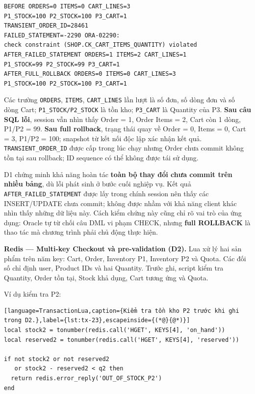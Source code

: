 \begingroup
{}\label{result:tx-17}
\nopagebreak[4]
\begin{Verbatim}
BEFORE ORDERS=0 ITEMS=0 CART_LINES=3
P1_STOCK=100 P2_STOCK=100 P3_CART=1
TRANSIENT_ORDER_ID=28461
FAILED_STATEMENT=-2290 ORA-02290:
check constraint (SHOP.CK_CART_ITEMS_QUANTITY) violated
AFTER_FAILED_STATEMENT ORDERS=1 ITEMS=2 CART_LINES=1
P1_STOCK=99 P2_STOCK=99 P3_CART=1
AFTER_FULL_ROLLBACK ORDERS=0 ITEMS=0 CART_LINES=3
P1_STOCK=100 P2_STOCK=100 P3_CART=1
\end{Verbatim}
\endgroup\par\smallskip
Các trường \texttt{ORDERS}, \texttt{ITEMS}, \texttt{CART\_\allowbreak{}LINES} lần lượt là số đơn, số dòng đơn và số dòng Cart; \texttt{P1\_\allowbreak{}STOCK/\allowbreak{}P2\_\allowbreak{}STOCK} là tồn kho; \texttt{P3\_\allowbreak{}CART} là Quantity của P3. \textbf{Sau câu SQL lỗi}, session vẫn nhìn thấy Order = 1, Order Items = 2, Cart còn 1 dòng, P1/P2 = 99. \textbf{Sau full rollback}, trạng thái quay về Order = 0, Items = 0, Cart = 3, P1/P2 = 100; snapshot từ kết nối độc lập xác nhận kết quả. \texttt{TRANSIENT\_\allowbreak{}ORDER\_\allowbreak{}ID} được cấp trong lúc chạy nhưng Order chưa commit không tồn tại sau rollback; ID sequence có thể không được tái sử dụng.

D1 chứng minh khả năng hoàn tác \textbf{toàn bộ thay đổi chưa commit trên nhiều bảng}, dù lỗi phát sinh ở bước cuối nghiệp vụ. Kết quả \texttt{AFTER\_\allowbreak{}FAILED\_\allowbreak{}STATEMENT} được lấy trong chính session nên thấy các INSERT/UPDATE chưa commit; không được nhầm với khả năng client khác nhìn thấy những dữ liệu này. Cách kiểm chứng này cũng chỉ rõ vai trò của ứng dụng: Oracle tự từ chối câu DML vi phạm CHECK, nhưng \textbf{full ROLLBACK} là thao tác mà chương trình phải chủ động thực hiện.

\textbf{Redis — Multi-key Checkout và pre-validation (D2).} Lua xử lý hai sản phẩm trên năm key: Cart, Order, Inventory P1, Inventory P2 và Quota. Các đối số chỉ định user, Product IDs và hai Quantity. Trước ghi, script kiểm tra Quantity, Order tồn tại, Stock khả dụng, Cart tương ứng và Quota.

Ví dụ kiểm tra P2:

\begin{lstlisting}[language=TransactionLua,caption={Kiểm tra tồn kho P2 trước khi ghi trong D2.},label={lst:tx-23},escapeinside={(*@}{@*)}]
local stock2 = tonumber(redis.call('HGET', KEYS[4], 'on_hand'))
local reserved2 = tonumber(redis.call('HGET', KEYS[4], 'reserved'))

if not stock2 or not reserved2
   or stock2 - reserved2 < q2 then
  return redis.error_reply('OUT_OF_STOCK_P2')
end
\end{lstlisting}

